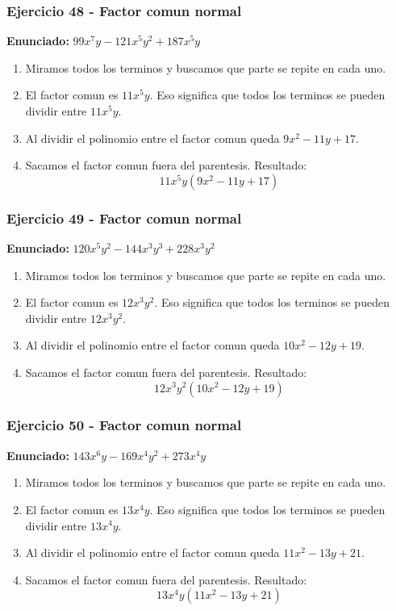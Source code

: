 \documentclass[11pt,a4paper]{article}
\begin{document}
\vspace{0.2cm}
\subsubsection*{Ejercicio 48 - Factor comun normal}
\textbf{Enunciado:} $ 99 x^{7} y - 121 x^{5} y^{2} + 187 x^{5} y $\par
\begin{enumerate}[leftmargin=2em]
\item Miramos todos los terminos y buscamos que parte se repite en cada uno.
\item El factor comun es \(11 x^{5} y\). Eso significa que todos los terminos se pueden dividir entre \(11 x^{5} y\).
\item Al dividir el polinomio entre el factor comun queda \(9 x^{2} - 11 y + 17\).
\item Sacamos el factor comun fuera del parentesis. Resultado: \[\boxed{11 x^{5} y\left(9 x^{2} - 11 y + 17\right)}\]
\end{enumerate}

\vspace{0.2cm}
\subsubsection*{Ejercicio 49 - Factor comun normal}
\textbf{Enunciado:} $ 120 x^{5} y^{2} - 144 x^{3} y^{3} + 228 x^{3} y^{2} $\par
\begin{enumerate}[leftmargin=2em]
\item Miramos todos los terminos y buscamos que parte se repite en cada uno.
\item El factor comun es \(12 x^{3} y^{2}\). Eso significa que todos los terminos se pueden dividir entre \(12 x^{3} y^{2}\).
\item Al dividir el polinomio entre el factor comun queda \(10 x^{2} - 12 y + 19\).
\item Sacamos el factor comun fuera del parentesis. Resultado: \[\boxed{12 x^{3} y^{2}\left(10 x^{2} - 12 y + 19\right)}\]
\end{enumerate}

\vspace{0.2cm}
\subsubsection*{Ejercicio 50 - Factor comun normal}
\textbf{Enunciado:} $ 143 x^{6} y - 169 x^{4} y^{2} + 273 x^{4} y $\par
\begin{enumerate}[leftmargin=2em]
\item Miramos todos los terminos y buscamos que parte se repite en cada uno.
\item El factor comun es \(13 x^{4} y\). Eso significa que todos los terminos se pueden dividir entre \(13 x^{4} y\).
\item Al dividir el polinomio entre el factor comun queda \(11 x^{2} - 13 y + 21\).
\item Sacamos el factor comun fuera del parentesis. Resultado: \[\boxed{13 x^{4} y\left(11 x^{2} - 13 y + 21\right)}\]
\end{enumerate}
\end{document}
